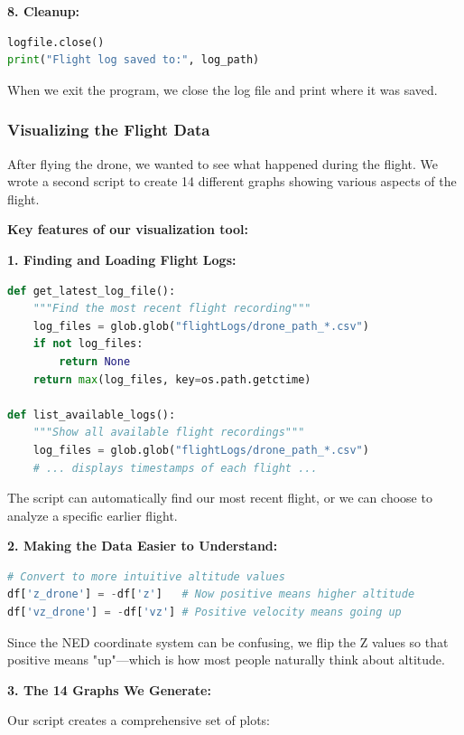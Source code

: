 \textbf{8. Cleanup:}
\begin{lstlisting}[language=Python]
logfile.close()
print("Flight log saved to:", log_path)
\end{lstlisting}

When we exit the program, we close the log file and print where it was saved.

\subsubsection{Visualizing the Flight Data}

After flying the drone, we wanted to see what happened during the flight. We wrote a second script to create 14 different graphs showing various aspects of the flight.

\textbf{Key features of our visualization tool:}

\textbf{1. Finding and Loading Flight Logs:}
\begin{lstlisting}[language=Python]
def get_latest_log_file():
    """Find the most recent flight recording"""
    log_files = glob.glob("flightLogs/drone_path_*.csv")
    if not log_files:
        return None
    return max(log_files, key=os.path.getctime)

def list_available_logs():
    """Show all available flight recordings"""
    log_files = glob.glob("flightLogs/drone_path_*.csv")
    # ... displays timestamps of each flight ...
\end{lstlisting}

The script can automatically find our most recent flight, or we can choose to analyze a specific earlier flight.

\textbf{2. Making the Data Easier to Understand:}
\begin{lstlisting}[language=Python]
# Convert to more intuitive altitude values
df['z_drone'] = -df['z']   # Now positive means higher altitude
df['vz_drone'] = -df['vz'] # Positive velocity means going up
\end{lstlisting}

Since the NED coordinate system can be confusing, we flip the Z values so that positive means "up"—which is how most people naturally think about altitude.

\textbf{3. The 14 Graphs We Generate:}

Our script creates a comprehensive set of plots:

